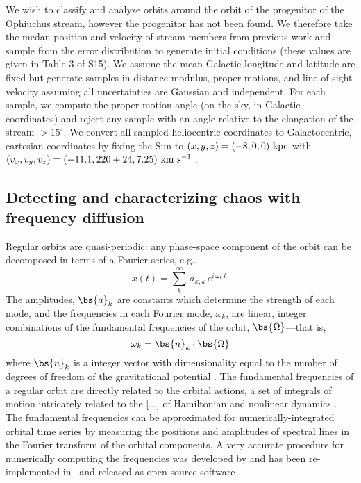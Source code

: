 \documentclass[letterpaper,12pt,preprint]{aastex}
\begin{document}
We wish to classify and analyze orbits around the orbit of the progenitor of the Ophiuchus stream, however the progenitor has not been found. We therefore take the medan position and velocity of stream members  from previous work and sample from the error distribution to generate initial conditions (these values are given in Table 3 of S15). We assume the mean Galactic longitude and latitude are fixed but generate samples in distance modulus, proper motions, and line-of-sight velocity assuming all uncertainties are Gaussian and independent. For each sample, we compute the proper motion angle (on the sky, in Galactic coordinates) and reject any sample with an angle relative to the elongation of the stream $>15^\circ$. We convert all sampled heliocentric coordinates to Galactocentric, cartesian coordinates by fixing the Sun to $(x,y,z) = (-8,0,0)~{\rm kpc}$ with $(v_x,v_y,v_z) = (-11.1, 220+24, 7.25)~{\rm km}~{\rm s}^{-1}$ \citep{schonrich10, bovy12}. 

\subsection{Detecting and characterizing chaos with frequency diffusion}\label{sec:chaos-indicator}

Regular orbits are quasi-periodic: any phase-space component of the orbit can be decomposed in terms of a Fourier series, e.g.,
\begin{equation}
	x(t) = \sum^\infty_k \, a_{x,k}\, e^{i\, \omega_k \, t}.
\end{equation}
The amplitudes, $\bs{a}_k$ are constants which determine the strength of each mode, and the frequencies in each Fourier mode, $\omega_k$, are linear, integer combinations of the fundamental frequencies of the orbit, $\bs{\Omega}$---that is,
\begin{equation}
	\omega_k = \bs{n}_k \cdot \bs{\Omega}
\end{equation}
where $\bs{n}_k$ is a integer vector with dimensionality equal to the number of degrees of freedom of the gravitational potential \citep[e.g.,][]{binney82, binneytremaine}. The fundamental frequencies of a regular orbit are directly related to the orbital actions, a set of integrals of motion intricately related to the [...] of Hamiltonian and nonlinear dynamics \citep[e.g.,][]{??}. The fundamental frequencies can be approximated for numerically-integrated orbital time series by measuring the positions and amplitudes of spectral lines in the Fourier transform of the orbital components. A very accurate procedure for numerically computing the frequencies was developed by \citet{laskar93} and has been re-implemented in \python\ and released as open-source software \citep[\superfreq;][]{superfreq}. 
\end{document}
